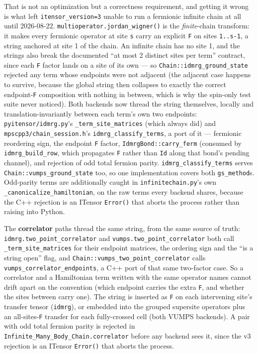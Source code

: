 \documentclass[11pt]{article}
\begin{document}
That is not an optimization but a correctness requirement, and getting it
wrong is what left \texttt{itensor\_version=3} unable to run a fermionic
infinite chain at all until 2026-08-22.
\texttt{multioperator.jordan\_wigner()} is the \emph{finite}-chain
transform: it makes every fermionic operator at site \texttt{s} carry an
explicit \texttt{F} on sites \texttt{1..s-1}, a string anchored at site 1
of the chain. An infinite chain has no site 1, and the strings also break
the documented ``at most 2 distinct sites per term'' contract, since each
\texttt{F} factor lands on a site of its own --- so
\texttt{Chain::idmrg\_ground\_state} rejected any term whose endpoints
were not adjacent (the adjacent case happens to survive, because the
global string then collapses to exactly the correct endpoint-\texttt{F}
composition with nothing in between, which is why the spin-only test
suite never noticed). Both backends now thread the string themselves,
locally and translation-invariantly between each term's own two
endpoints: \texttt{pyitensor/idmrg.py}'s \texttt{\_term\_site\_matrices}
(which always did) and \texttt{mpscpp3/chain\_session.h}'s
\texttt{idmrg\_classify\_terms}, a port of it --- fermionic reordering
sign, the endpoint \texttt{F} factor, \texttt{IdmrgBond::carry\_ferm}
(consumed by \texttt{idmrg\_build\_row}, which propagates \texttt{F}
rather than \texttt{Id} along that bond's pending channel), and rejection
of odd total fermion parity. \texttt{idmrg\_classify\_terms} serves
\texttt{Chain::vumps\_ground\_state} too, so one implementation covers
both \texttt{gs\_method}s. Odd-parity terms are additionally caught in
\texttt{infinitechain.py}'s own \texttt{\_canonicalize\_hamiltonian}, on
the raw terms every backend shares, because the C++ rejection is an
ITensor \texttt{Error()} that aborts the process rather than raising into
Python.

The \textbf{correlator} paths thread the same string, from the same source
of truth: \texttt{idmrg.two\_point\_correlator} and
\texttt{vumps.two\_point\_correlator} both call
\texttt{\_term\_site\_matrices} for their endpoint matrices, the ordering
sign and the ``is a string open'' flag, and
\texttt{Chain::vumps\_two\_point\_correlator} calls
\texttt{vumps\_correlator\_endpoints}, a C++ port of that same two-factor
case. So a correlator and a Hamiltonian term written with the same
operator names cannot drift apart on the convention (which endpoint
carries the extra \texttt{F}, and whether the sites between carry one).
The string is inserted as \texttt{F} on each intervening site's transfer
tensor (\texttt{idmrg}), or embedded into the grouped supersite operators
plus an all-sites-\texttt{F} transfer for each fully-crossed cell (both
VUMPS backends). A pair with odd total fermion parity is rejected in
\texttt{Infinite\_Many\_Body\_Chain.correlator} before any backend sees
it, since the v3 rejection is an ITensor \texttt{Error()} that aborts the
process.
\end{document}
